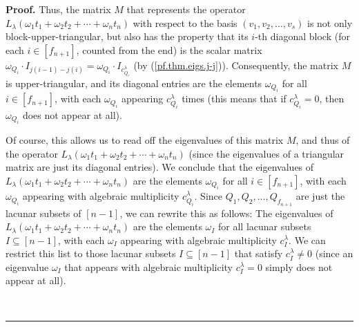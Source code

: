 \documentclass[numbers=enddot,12pt,final,onecolumn,notitlepage]{scrartcl}%
\theoremstyle{definition}
\newenvironment{proof}[1][Proof]{\noindent\textbf{#1.} }{\ \rule{0.5em}{0.5em}}
\begin{document}
\begin{proof}
Thus, the matrix $M$ that represents the operator $L_{\lambda}\left(
\omega_{1}t_{1}+\omega_{2}t_{2}+\cdots+\omega_{n}t_{n}\right)  $ with respect
to the basis $\left(  v_{1},v_{2},\ldots,v_{s}\right)  $ is not only
block-upper-triangular, but also has the property that its $i$-th diagonal
block (for each $i\in\left[  f_{n+1}\right]  $, counted from the end) is the
scalar matrix $\omega_{Q_{i}}\cdot I_{j\left(  i-1\right)  -j\left(  i\right)
}=\omega_{Q_{i}}\cdot I_{c_{Q_{i}}^{\lambda}}$ (by (\ref{pf.thm.eigs.j-j})).
Consequently, the matrix $M$ is upper-triangular, and its diagonal entries are
the elements $\omega_{Q_{i}}$ for all $i\in\left[  f_{n+1}\right]  $, with
each $\omega_{Q_{i}}$ appearing $c_{Q_{i}}^{\lambda}$ times (this means that
if $c_{Q_{i}}^{\lambda}=0$, then $\omega_{Q_{i}}$ does not appear at all).

Of course, this allows us to read off the eigenvalues of this matrix $M$, and
thus of the operator $L_{\lambda}\left(  \omega_{1}t_{1}+\omega_{2}%
t_{2}+\cdots+\omega_{n}t_{n}\right)  $ (since the eigenvalues of a triangular
matrix are just its diagonal entries). We conclude that the eigenvalues of
$L_{\lambda}\left(  \omega_{1}t_{1}+\omega_{2}t_{2}+\cdots+\omega_{n}%
t_{n}\right)  $ are the elements $\omega_{Q_{i}}$ for all $i\in\left[
f_{n+1}\right]  $, with each $\omega_{Q_{i}}$ appearing with algebraic
multiplicity $c_{Q_{i}}^{\lambda}$. Since $Q_{1},Q_{2},\ldots,Q_{f_{n+1}}$ are
just the lacunar subsets of $\left[  n-1\right]  $, we can rewrite this as
follows: The eigenvalues of $L_{\lambda}\left(  \omega_{1}t_{1}+\omega
_{2}t_{2}+\cdots+\omega_{n}t_{n}\right)  $ are the elements $\omega_{I}$ for
all lacunar subsets $I\subseteq\left[  n-1\right]  $, with each $\omega_{I}$
appearing with algebraic multiplicity $c_{I}^{\lambda}$. We can restrict this
list to those lacunar subsets $I\subseteq\left[  n-1\right]  $ that satisfy
$c_{I}^{\lambda}\neq0$ (since an eigenvalue $\omega_{I}$ that appears with
algebraic multiplicity $c_{I}^{\lambda}=0$ simply does not appear at all).


\end{proof}
\end{document}
